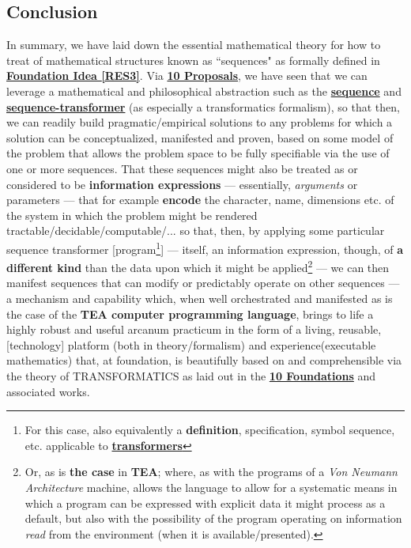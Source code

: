 \documentclass[a4paper, 18pt]{book} %
\begin{document}
\begin{appendices}
\section{Conclusion}

In summary, we have laid down the essential mathematical theory for how to treat of mathematical structures known as ``sequences" as formally defined in \textbf{\hyperref[RES3]{Foundation Idea \ref{RES3}}}. Via \textbf{\hyperref[SECPROP]{10 Proposals}}, we have seen that we can leverage a mathematical and philosophical abstraction such as the \textbf{\hyperref[RES3]{sequence}} and \textbf{\hyperref[RES7]{sequence-transformer}} (as especially a transformatics formalism), so that then, we can readily build pragmatic/empirical solutions to any problems for which a solution can be conceptualized, manifested and proven, based on some model of the problem that allows the problem space to be fully specifiable via the use of one or more sequences. That these sequences might also be treated as or considered to be \textbf{information expressions}\cite{lnspaper} --- essentially, \textit{arguments} or parameters --- that for example \textbf{encode} the character, name, dimensions etc. of the system in which the problem might be rendered tractable/decidable/computable/... so that, then, by applying some particular sequence transformer [program\footnote{For this case, also equivalently a \textbf{definition}, specification, symbol sequence, etc. applicable to \textbf{\hyperref[RES7]{transformers}}}] --- itself, an information expression, though, of \textbf{a different kind} than the data upon which it might be applied\footnote{Or, as is \textbf{the case} in \textbf{TEA}; where, as with the programs of a \textit{Von Neumann Architecture} machine, allows the language to allow for a systematic means in which a program can be expressed with explicit data it might process as a default, but also with the possibility of the program operating on information \textit{read} from the environment (when it is available/presented).} --- we can then manifest sequences that can modify or predictably operate on other sequences --- a mechanism and capability which, when well orchestrated and manifested as is the case of the \textbf{TEA computer programming language}\cite{Lutalo2024TEATAZ}, brings to life a highly robust and useful arcanum practicum in the form of a living, reusable, [technology] platform (both in theory/formalism) and experience(executable mathematics) that, at foundation, is beautifully based on and comprehensible via the theory of TRANSFORMATICS as laid out in the \textbf{\hyperref[SECFOUND]{10 Foundations}} and associated works.


\end{appendices}
\end{document}
